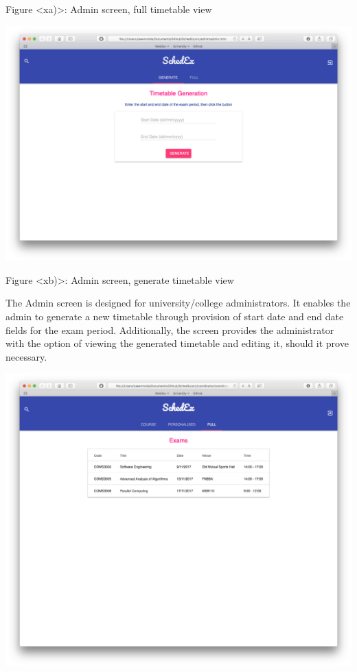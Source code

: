 \documentclass{article}
\begin{document}
Figure <xa)>: Admin screen, full timetable view

\centerline{\includegraphics[scale=0.4]{admin_generate}}

Figure <xb)>: Admin screen, generate timetable view 

The Admin screen is designed for university/college administrators. It enables the admin to generate a new timetable through provision of start date and end date fields for the exam period. Additionally, the screen provides the administrator with the option of viewing the generated timetable and editing it, should it prove necessary. 

\centerline{\includegraphics[scale=0.4]{coordinator_full}}
\end{document}
